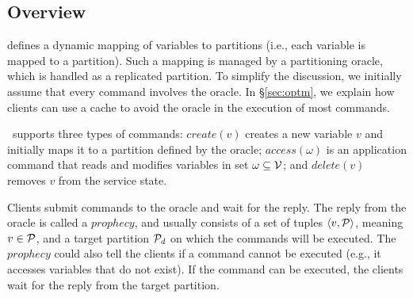 \subsection{Overview}



\dynastar defines a dynamic mapping of variables to partitions (i.e., each variable is mapped to a partition).
Such a mapping is managed by a partitioning oracle, which is handled as a replicated partition.
To simplify the discussion, we initially assume that every command involves the oracle.
In \S\ref{sec:optm}, we explain how clients can use a cache to avoid the oracle in the execution of most commands.

\dynastar\ supports three types of commands:
$create(v)$ creates a new variable $v$ and initially maps it to a partition defined by the oracle;
$access(\omega)$ is an application command that reads and modifies variables in set $\omega \subseteq \mathcal{V}$; and
$delete(v)$ removes $v$ from the service state.



Clients submit commands to the oracle and wait for the reply. 
The reply from the oracle is called a $prophecy$, and usually 
consists of a set of tuples $\langle v, \mathcal{P} \rangle$, meaning 
$v \in \mathcal{P}$, and a target partition $\mathcal{P}_d$ on which the commands 
will be executed. The $prophecy$ could also tell the clients 
if a command cannot be executed (e.g., it accesses 
variables that do not exist). If the command can be executed, 
the clients wait for the reply from the target partition.


